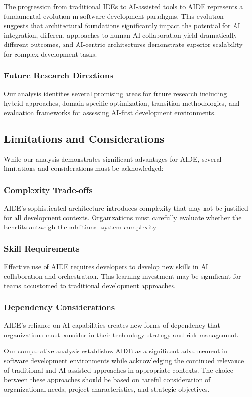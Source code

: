 The progression from traditional IDEs to AI-assisted tools to AIDE represents a fundamental evolution in software development paradigms. This evolution suggests that architectural foundations significantly impact the potential for AI integration, different approaches to human-AI collaboration yield dramatically different outcomes, and AI-centric architectures demonstrate superior scalability for complex development tasks.

\subsubsection{Future Research Directions}

Our analysis identifies several promising areas for future research including hybrid approaches, domain-specific optimization, transition methodologies, and evaluation frameworks for assessing AI-first development environments.

\subsection{Limitations and Considerations}

While our analysis demonstrates significant advantages for AIDE, several limitations and considerations must be acknowledged:

\subsubsection{Complexity Trade-offs}

AIDE's sophisticated architecture introduces complexity that may not be justified for all development contexts. Organizations must carefully evaluate whether the benefits outweigh the additional system complexity.

\subsubsection{Skill Requirements}

Effective use of AIDE requires developers to develop new skills in AI collaboration and orchestration. This learning investment may be significant for teams accustomed to traditional development approaches.

\subsubsection{Dependency Considerations}

AIDE's reliance on AI capabilities creates new forms of dependency that organizations must consider in their technology strategy and risk management.

Our comparative analysis establishes AIDE as a significant advancement in software development environments while acknowledging the continued relevance of traditional and AI-assisted approaches in appropriate contexts. The choice between these approaches should be based on careful consideration of organizational needs, project characteristics, and strategic objectives.
